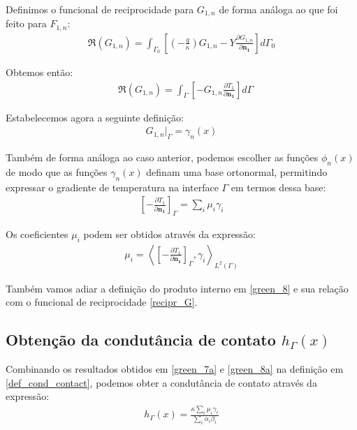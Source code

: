 Definimos o funcional de reciprocidade para $G_{1,n}$ de forma análoga ao que foi feito para $F_{1,n}$:
\begin{align}
	\Re(G_{1,n}) = \int_{\Gamma_0}\left[\left(-\frac{q}{\kappa}\right)G_{1,n} - Y\frac{\partial G_{1,n}}{\partial\mathbf{n_1}}\right]d\Gamma_0 \label{recipr_Ga}
\end{align}

Obtemos então:
\begin{align}
	&
	\Re(G_{1,n})
	=
	\int_{\Gamma}\left[-G_{1,n}\frac{\partial T_1}{\partial\mathbf{n_1}}\right] d\Gamma	 \label{recipr_G}
\end{align}

Estabelecemos agora a seguinte definição:
\begin{align}
	G_{1,n}\big|_\Gamma = \gamma_n(x) \label{def_99}
\end{align}

Também de forma análoga ao caso anterior, podemos escolher as funções $\phi_n(x)$ de modo que as funções $\gamma_n(x)$ definam
uma base ortonormal, permitindo expressar o gradiente de temperatura na interface $\Gamma$ em termos dessa base:
\begin{align}
	\left[-\frac{\partial T_1}{\partial\mathbf{n_1}}\right]_\Gamma = \sum_i \mu_i \gamma_i\label{green_8a}
\end{align}

Os coeficientes $\mu_i$ podem ser obtidos através da expressão:
\begin{align}
	\mu_i = \left\langle \left[-\frac{\partial T_1}{\partial\mathbf{n_1}}\right]_\Gamma, \gamma_i \right\rangle_{L^2(\Gamma)}\label{green_8}
\end{align}

Também vamos adiar a definição do produto interno em \eqref{green_8} e sua relação com o funcional de reciprocidade \eqref{recipr_G}.

\subsection{Obtenção da condutância de contato $h_{\Gamma}(x)$}

Combinando os resultados obtidos em \eqref{green_7a} e \eqref{green_8a} na definição em \eqref{def_cond_contact}, podemos obter a condutância de contato através da expressão:
\begin{align}
	h_{\Gamma}(x) = \frac{\kappa\sum_i \mu_i \gamma_i}{\sum_i \alpha_i \beta_i} \label{eq_cond_contato}
\end{align}

